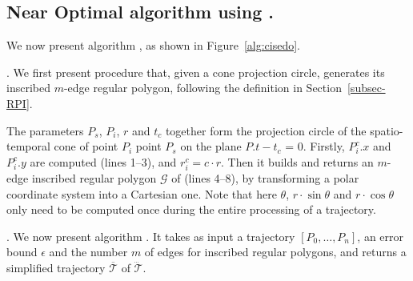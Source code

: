 


\subsection{Near Optimal algorithm using \sed.}


We now present algorithm \cisto, as shown in Figure~\ref{alg:cisedo}.

.
We first present procedure  that, given a cone projection circle, generates its inscribed $m$-edge regular polygon,  following the definition in Section~\ref{subsec-RPI}.

The parameters $P_s$, $P_i$, $r$ and $t_c$ together form the projection circle  of the spatio-temporal cone  of point $P_{i}$ \wrt point $P_s$ on the plane $P.t - t_c$ = $0$. Firstly, $P^c_i.x$ and $P^c_i.y$ are computed (lines 1--3), and $r^c_i = c\cdot r$.
Then it builds and returns an $m$-edge inscribed regular polygon $\mathcal{G}$ of  (lines 4--8), by transforming a polar coordinate system
into a Cartesian one. Note that here $\theta$, $r\cdot\sin\theta$ and $r\cdot\cos\theta$ only need to be computed once during the entire processing of a trajectory.

. We now present algorithm \cisto. It takes as input a trajectory ${[P_0, \ldots, P_n]}$, an error bound $\epsilon$ and the number $m$ of edges for inscribed regular polygons, and returns a simplified  trajectory $\overline{\mathcal{T}}$ of $\dddot{\mathcal{T}}$.


